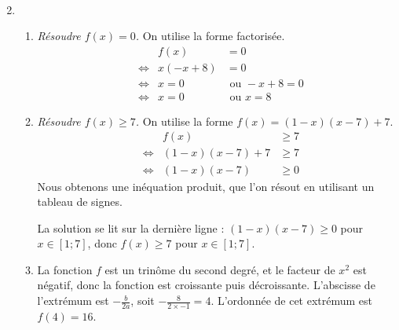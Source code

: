 \documentclass[12pt]{article}
\begin{document}
\begin{exercice}
\begin{enumerate}
\begin{align*}
          \end{align*}
        \item~
          \begin{enumerate}
            \item \emph{Résoudre $f(x)=0$.} On utilise la forme factorisée.
          \begin{align*}
            && f(x) &= 0\\
            &\iff& x(-x+8)&=0\\
            &\iff& x=0 &\text{ ou } -x+8=0\\
            &\iff& x=0 &\text{ ou } x=8
          \end{align*}
        \item \emph{Résoudre $f(x)\geq7$.} On utilise la forme $f(x)=(1-x)(x-7)+7$.
          \begin{align*}
            && f(x) &\geq 7\\
            &\iff& (1-x)(x-7)+7 &\geq7\\
            &\iff& (1-x)(x-7) &\geq0
          \end{align*}
          Nous obtenons une inéquation produit, que l'on résout en utilisant un tableau de signes.
  \begin{center}
\end{center}
La solution se lit sur la dernière ligne : $(1-x)(x-7)\geq0$ pour $x\in\left[1;7\right]$, donc $f(x)\geq7$ pour $x\in\left[1;7\right]$.
\item
  \begin{multicols}{2}
    La fonction $f$ est un trinôme du second degré, et le facteur de $x^2$
    est négatif, donc la fonction est croissante puis décroissante.
    L'abscisse de l'extrémum est $-\frac{b}{2a}$, soit
    $-\frac{8}{2\times-1}=4$. L'ordonnée de cet extrémum est $f(4)=16$.

    \columnbreak

  \begin{center}
  \end{center}
\end{multicols}
          \end{enumerate}
  \end{enumerate}


\end{exercice}
\end{document}
